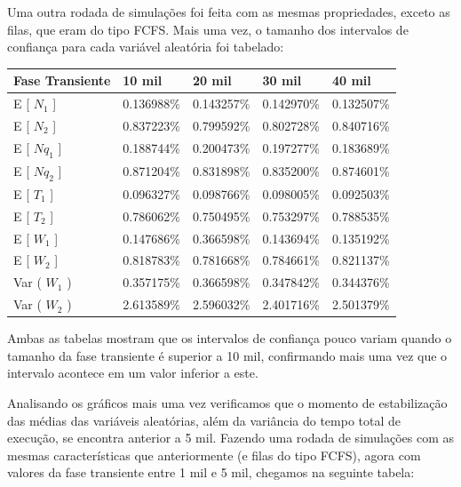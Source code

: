 \documentclass[a4paper,10pt]{article}
\begin{document}
    Uma outra rodada de simulações foi feita com as mesmas propriedades, exceto as filas, que eram do tipo FCFS. Mais uma vez, o tamanho dos intervalos de confiança para cada variável aleatória foi tabelado:

\begin{center}
\begin{tabular} { | l | l | l | l | l | }
    \hline
    Fase Transiente & 10 mil     & 20 mil     & 30 mil     & 40 mil \\ \hline
    E [ $N_1$ ]     & 0.136988\% & 0.143257\% & 0.142970\% & 0.132507\% \\ \hline
    E [ $N_2$ ]     & 0.837223\% & 0.799592\% & 0.802728\% & 0.840716\% \\ \hline
    E [ $Nq_1$ ]    & 0.188744\% & 0.200473\% & 0.197277\% & 0.183689\% \\ \hline
    E [ $Nq_2$ ]    & 0.871204\% & 0.831898\% & 0.835200\% & 0.874601\% \\ \hline
    E [ $T_1$ ]     & 0.096327\% & 0.098766\% & 0.098005\% & 0.092503\% \\ \hline
    E [ $T_2$ ]     & 0.786062\% & 0.750495\% & 0.753297\% & 0.788535\% \\ \hline
    E [ $W_1$ ]     & 0.147686\% & 0.366598\% & 0.143694\% & 0.135192\% \\ \hline
    E [ $W_2$ ]     & 0.818783\% & 0.781668\% & 0.784661\% & 0.821137\% \\ \hline
    Var ( $W_1$ )   & 0.357175\% & 0.366598\% & 0.347842\% & 0.344376\% \\ \hline
    Var ( $W_2$ )   & 2.613589\% & 2.596032\% & 2.401716\% & 2.501379\% \\ \hline
\end{tabular}
\end{center}

    Ambas as tabelas mostram que os intervalos de confiança pouco variam quando o tamanho da fase transiente é superior a 10 mil, confirmando mais uma vez que o intervalo acontece em um valor inferior a este.

    Analisando os gráficos mais uma vez verificamos que o momento de estabilização das médias das variáveis aleatórias, além da variância do tempo total de execução, se encontra anterior a 5 mil. Fazendo uma rodada de simulações com as mesmas características que anteriormente (e filas do tipo FCFS), agora com valores da fase transiente entre 1 mil e 5 mil, chegamos na seguinte tabela:
\end{document}
